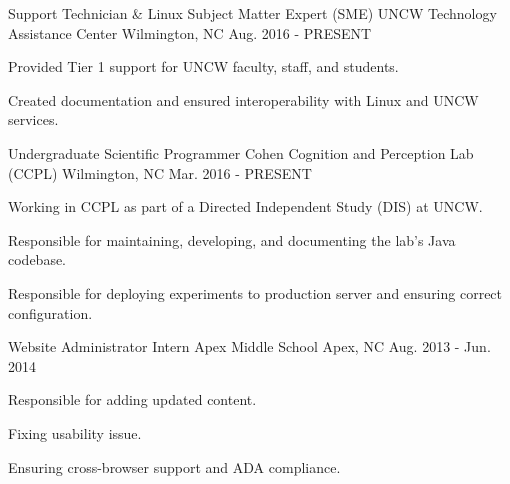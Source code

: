 

\begin{cventries}

  \cventry
    {Support Technician \& Linux Subject Matter Expert (SME)} %
    {UNCW Technology Assistance Center} %
    {Wilmington, NC} %
    {Aug. 2016 - PRESENT} %
    {
      \begin{cvitems} %
        \item {Provided Tier 1 support for UNCW faculty, staff, and students.}
        \item {Created documentation and ensured interoperability with Linux and UNCW services.}
      \end{cvitems}
    }

  \cventry
    {Undergraduate Scientific Programmer} %
    {Cohen Cognition and Perception Lab (CCPL)} %
    {Wilmington, NC} %
    {Mar. 2016 - PRESENT} %
    {
      \begin{cvitems}
        \item {Working in CCPL as part of a Directed Independent Study (DIS) at UNCW.}
        \item {Responsible for maintaining, developing, and documenting the lab's Java codebase.}
        \item {Responsible for deploying experiments to production server and ensuring correct configuration.}
      \end{cvitems}
    }
  \cventry
    {Website Administrator Intern} %
    {Apex Middle School} %
    {Apex, NC} %
    {Aug. 2013 - Jun. 2014} %
    { 
      \begin{cvitems}
        \item {Responsible for adding updated content.}
        \item {Fixing usability issue.}
        \item {Ensuring cross-browser support and ADA compliance.}
      \end{cvitems}
    }
\end{cventries}
